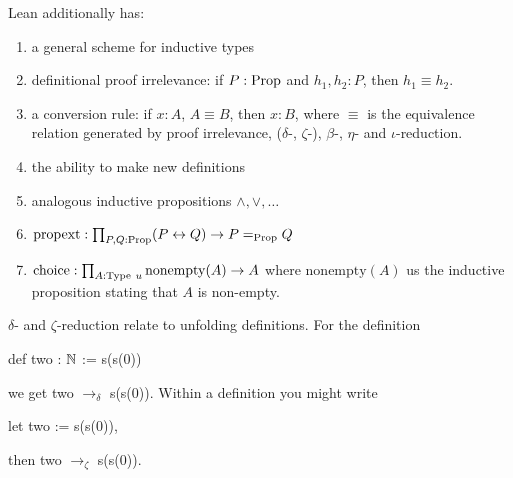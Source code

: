 \begin{rem}
    Lean additionally has: 
    \begin{enumerate}
        \item a general scheme for inductive types
        \item definitional proof irrelevance: if $P : \mathrm{Prop}$ and $h_1, h_2 : P$, then $h_1 \equiv h_2$.
        \item a conversion rule: if $x : A$, $A \equiv B$, then $x : B$, where $\equiv$ is the equivalence relation generated by proof irrelevance, ($\delta$-, $\zeta$-), $\beta$-, $\eta$- and $\iota$-reduction.
        \item the ability to make new definitions
        \item analogous inductive propositions ${\wedge}, {\vee}, \dots$
        \item $\mathrm{propext}: \prod_{P, Q : \mathrm{Prop}} (P \leftrightarrow Q) \to P \mathrel{=_{\mathrm{Prop}}} Q$
        \item $\mathrm{choice} : \prod_{A : \mathrm{Type}\ u} \mathrm{nonempty}(A) \to A$ where $\mathrm{nonempty}(A)$ us the inductive proposition stating that $A$ is non-empty.
    \end{enumerate}
\end{rem}

\begin{example}
    $\delta$- and $\zeta$-reduction relate to unfolding definitions.
    For the definition 
    \begin{center}
        {\ttfamily def two : $\mathbb{N}$ := s(s(0))}
    \end{center} 
    we get {\ttfamily two $\mathrel{\to_\delta}$ s(s(0))}. 
    Within a definition you might write 
    \begin{center}
        {\ttfamily let two := s(s(0))}, 
    \end{center}
    then {\ttfamily two $\to_{\zeta}$ s(s(0))}.
\end{example}